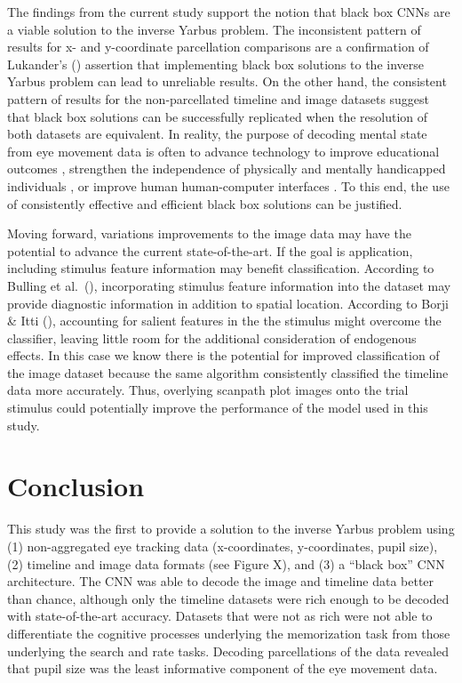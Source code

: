 \documentclass[
  english,
  man]{apa6}
\begin{document}
The findings from the current study support the notion that black box CNNs are a viable solution to the inverse Yarbus problem. The inconsistent pattern of results for x- and y-coordinate parcellation comparisons are a confirmation of Lukander's () assertion that implementing black box solutions to the inverse Yarbus problem can lead to unreliable results. On the other hand, the consistent pattern of results for the non-parcellated timeline and image datasets suggest that black box solutions can be successfully replicated when the resolution of both datasets are equivalent. In reality, the purpose of decoding mental state from eye movement data is often to advance technology to improve educational outcomes , strengthen the independence of physically and mentally handicapped individuals , or improve human human-computer interfaces . To this end, the use of consistently effective and efficient black box solutions can be justified.

Moving forward, variations improvements to the image data may have the potential to advance the current state-of-the-art. If the goal is application, including stimulus feature information may benefit classification. According to Bulling et al.~(), incorporating stimulus feature information into the dataset may provide diagnostic information in addition to spatial location. According to Borji \& Itti (), accounting for salient features in the the stimulus might overcome the classifier, leaving little room for the additional consideration of endogenous effects. In this case we know there is the potential for improved classification of the image dataset because the same algorithm consistently classified the timeline data more accurately. Thus, overlying scanpath plot images onto the trial stimulus could potentially improve the performance of the model used in this study.

\section{Conclusion}

This study was the first to provide a solution to the inverse Yarbus problem using (1) non-aggregated eye tracking data (x-coordinates, y-coordinates, pupil size), (2) timeline and image data formats (see Figure X), and (3) a \enquote{black box} CNN architecture. The CNN was able to decode the image and timeline data better than chance, although only the timeline datasets were rich enough to be decoded with state-of-the-art accuracy. Datasets that were not as rich were not able to differentiate the cognitive processes underlying the memorization task from those underlying the search and rate tasks. Decoding parcellations of the data revealed that pupil size was the least informative component of the eye movement data.
\end{document}
